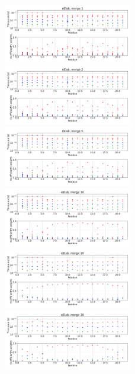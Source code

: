 \documentclass[12pt]{article}
\begin{document}
 


\begin{figure}
\centering
\includegraphics[width=0.5\textwidth]{eElab_1.png}
\includegraphics[width=0.5\textwidth]{eElab_2.png}
\includegraphics[width=0.5\textwidth]{eElab_5.png}
\includegraphics[width=0.5\textwidth]{eElab_10.png}
\includegraphics[width=0.5\textwidth]{eElab_20.png}
\includegraphics[width=0.5\textwidth]{eElab_30.png}
\end{figure}
\end{document}
